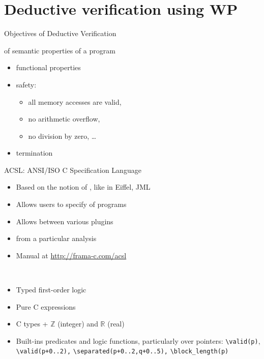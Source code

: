 
\section{Deductive verification using WP}

\begin{frame}{Objectives of Deductive Verification}

 of semantic properties of a program
\begin{itemize}
\item functional properties
\item safety: 
\begin{itemize}
\item all memory accesses are valid, 
\item no arithmetic overflow, 
\item no division by zero, \dots
\end{itemize}
\item termination
\end{itemize}
\end{frame}


\begin{frame}[fragile]{ACSL: ANSI/ISO C Specification Language}
\\ %
\begin{itemize}
\item Based on the notion of , like in Eiffel, JML
\item Allows users to specify  of programs
\item Allows  between various plugins
\item {} from a particular analysis
\item Manual at \url{http://frama-c.com/acsl}
\end{itemize}
\\ %
\begin{itemize}
\item Typed first-order logic
\item Pure C expressions
\item C types + $\mathbb{Z}$ (integer) and $\mathbb{R}$ (real)
\item Built-ins predicates and logic functions, particularly over
pointers: 
\lstinline'\valid(p)', \lstinline'\valid(p+0..2),'
\lstinline'\separated(p+0..2,q+0..5),' \lstinline'\block_length(p)'
\end{itemize}
\end{frame}


